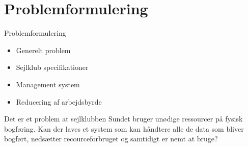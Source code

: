 \section{Problemformulering}

\begin{frame}{Problemformulering}
  
  \begin{itemize}
    \item Generelt problem
    
    \item Sejlklub specifikationer
    
    \item Management system
    
    \item Reducering af arbejdsbyrde
    
  \end{itemize}
Det er et problem at sejlklubben Sundet bruger unødige ressourcer på fysisk bogføring.
Kan der laves et system som kan håndtere alle de data som bliver bogført, nedsætter
recourceforbruget og samtidigt er nemt at bruge?
\end{frame}
